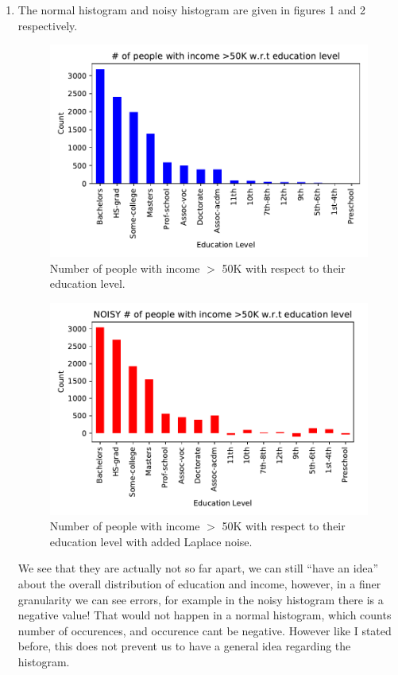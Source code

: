 \documentclass[12pt,reqno]{amsart}
\begin{document}
\begin{enumerate}[label=(\alph*)]
\item The normal histogram and noisy histogram are given in figures 1 and 2 respectively.
\begin{figure}[ht]
 	\label{fig:hist}
 	\caption{Number of people with income $>$ 50K with respect to their education level.}
 	\includegraphics[width=0.7\linewidth]{histogram.pdf}
\end{figure}
\begin{figure}[ht]
 	\label{fig:histnoise}
 	\caption{Number of people with income $>$ 50K with respect to their education level with added Laplace noise.}
 	\includegraphics[width=0.7\linewidth]{histogramNoisy.pdf}
\end{figure}
We see that they are actually not so far apart, we can still ``have an idea'' about the overall distribution of education and income, however, in a finer granularity we can see errors, for example in the noisy histogram there is a negative value! That would not happen in a normal histogram, which counts number of occurences, and occurence cant be negative. However like I stated before, this does not prevent us to have a general idea regarding the histogram.


\end{enumerate}
\end{document}

